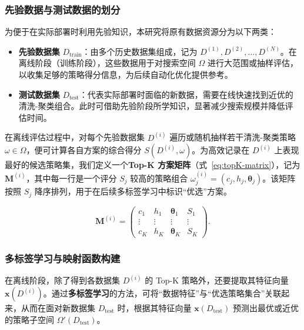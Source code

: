 \documentclass[10pt]{article} %
\numberwithin{equation}{section}
\begin{document}
\subsubsection{先验数据与测试数据的划分}
\label{subsec:dataset-split}

为便于在实际部署时利用先验知识，本研究将原有数据资源分为以下两类：
\begin{itemize}
    \item \textbf{先验数据集} $D_{\text{train}}$：由多个历史数据集组成，记为 ${D^{(1)}, D^{(2)}, \dots, D^{(N)}}$。在离线阶段（训练阶段），这些数据用于对搜索空间 $\Omega$ 进行大范围或抽样评估，以收集足够的策略得分信息，为后续自动化优化提供参考。
    \item \textbf{测试数据集} $D_{\text{test}}$：代表实际部署时面临的新数据，需要在线快速找到近优的清洗-聚类组合。此时可借助先验阶段所学知识，显著减少搜索规模并降低评估时间。
\end{itemize}

在离线评估过程中，对每个先验数据集 $D^{(i)}$ 遍历或随机抽样若干清洗-聚类策略 $\omega \in \Omega$，便可计算各自方案的综合得分 $S(D^{(i)}, \omega)$。为高效记录在 $D^{(i)}$ 上表现最好的候选策略集，我们定义一个\textbf{Top-K 方案矩阵}（式~\eqref{eq:topK-matrix}），记为 $\mathbf{M}^{(i)}$，其中每一行是一个评分 $S_j$ 较高的策略组合 $\omega_j^{(i)}=(c_j,h_j,\boldsymbol{\theta}_j)$。该矩阵按照 $S_j$ 降序排列，用于在后续多标签学习中标识“优选”方案。

\begin{equation}\label{eq:topK-matrix}
\mathbf{M}^{(i)} 
= 
\begin{pmatrix}
c_1 & h_1 & \boldsymbol{\theta}_1 & S_1 \\
\vdots & \vdots & \vdots & \vdots \\
c_K & h_K & \boldsymbol{\theta}_K & S_K
\end{pmatrix}.
\end{equation}

\subsubsection{多标签学习与映射函数构建}
\label{subsec:multi-label}

在离线阶段，除了得到各数据集 $D^{(i)}$ 的 Top-K 策略外，还要提取其特征向量 $\mathbf{x}(D^{(i)})$。通过\textbf{多标签学习}的方法，可将“数据特征”与“优选策略集合”关联起来，从而在面对新数据集 $D_{\text{test}}$ 时，根据其特征向量 $\mathbf{x}(D_{\text{test}})$ 预测出最优或近优的策略子空间 $\Omega'(D_{\text{test}})$。
\end{document}
